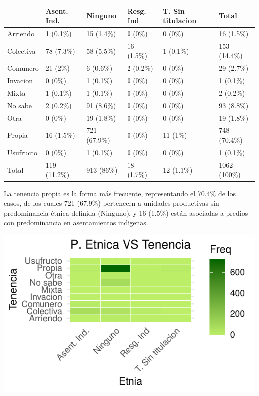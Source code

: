 \documentclass[]{tufte-handout}
\begin{document}
\begin{tabular}{llllll}
\toprule
  & Asent. Ind. & Ninguno & Resg. Ind & T. Sin titulacion & Total\\
\midrule
Arriendo & 1 (0.1\%) & 15 (1.4\%) & 0 (0\%) & 0 (0\%) & 16 (1.5\%)\\
Colectiva & 78 (7.3\%) & 58 (5.5\%) & 16 (1.5\%) & 1 (0.1\%) & 153 (14.4\%)\\
Comunero & 21 (2\%) & 6 (0.6\%) & 2 (0.2\%) & 0 (0\%) & 29 (2.7\%)\\
Invacion & 0 (0\%) & 1 (0.1\%) & 0 (0\%) & 0 (0\%) & 1 (0.1\%)\\
Mixta & 1 (0.1\%) & 1 (0.1\%) & 0 (0\%) & 0 (0\%) & 2 (0.2\%)\\
\addlinespace
No sabe & 2 (0.2\%) & 91 (8.6\%) & 0 (0\%) & 0 (0\%) & 93 (8.8\%)\\
Otra & 0 (0\%) & 19 (1.8\%) & 0 (0\%) & 0 (0\%) & 19 (1.8\%)\\
Propia & 16 (1.5\%) & 721 (67.9\%) & 0 (0\%) & 11 (1\%) & 748 (70.4\%)\\
Usufructo & 0 (0\%) & 1 (0.1\%) & 0 (0\%) & 0 (0\%) & 1 (0.1\%)\\
Total & 119 (11.2\%) & 913 (86\%) & 18 (1.7\%) & 12 (1.1\%) & 1062 (100\%)\\
\bottomrule
\end{tabular}
\newpage

\justify

La tenencia propia es la forma más frecuente, representando el 70.4\% de
los casos, de los cuales 721 (67.9\%) pertenecen a unidades productivas
sin predominancia étnica definida (Ninguno), y 16 (1.5\%) están
asociadas a predios con predominancia en asentamientos indígenas.

\begin{marginfigure}
\includegraphics[width=1.3\linewidth]{Informe_files/figure-latex/heat1-1} \end{marginfigure}
\end{document}

